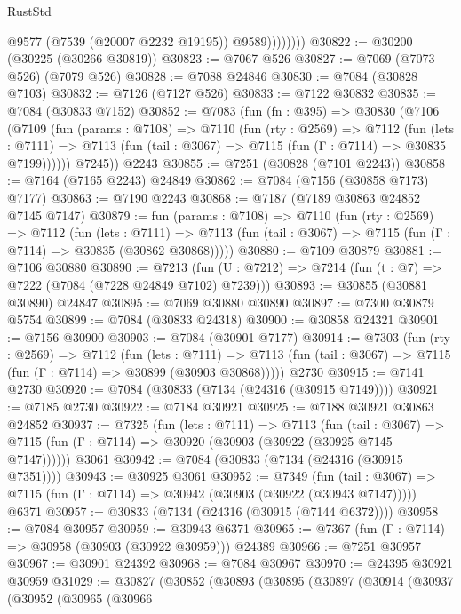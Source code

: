 \begin{lexlean}{RustStd}
\begin{coremodule}
                    @9577
                    (@7539 (@20007 @2232 @19195))
                    @9589))))))))
@30822 := @30200 (@30225 (@30266 @30819))
@30823 := @7067 @526
@30827 := @7069 (@7073 @526) (@7079 @526)
@30828 := @7088 @24846
@30830 := @7084 (@30828 @7103)
@30832 := @7126 (@7127 @526)
@30833 := @7122 @30832
@30835 := @7084 (@30833 @7152)
@30852 := @7083
    (fun (fn : @395) =>
    @30830
      (@7106
        (@7109
          (fun (params : @7108) =>
          @7110
            (fun (rty : @2569) =>
            @7112
              (fun (lets : @7111) =>
              @7113 (fun (tail : @3067) => @7115 (fun (Γ : @7114) => @30835 @7199))))))
        @7245))
    @2243
@30855 := @7251 (@30828 (@7101 @2243))
@30858 := @7164 (@7165 @2243) @24849
@30862 := @7084 (@7156 (@30858 @7173) @7177)
@30863 := @7190 @2243
@30868 := @7187 (@7189 @30863 @24852 @7145 @7147)
@30879 := fun (params : @7108) =>
  @7110
    (fun (rty : @2569) =>
    @7112
      (fun (lets : @7111) =>
      @7113 (fun (tail : @3067) => @7115 (fun (Γ : @7114) => @30835 (@30862 @30868)))))
@30880 := @7109 @30879
@30881 := @7106 @30880
@30890 := @7213
    (fun (U : @7212) => @7214 (fun (t : @7) => @7222 (@7084 (@7228 @24849 @7102) @7239)))
@30893 := @30855 (@30881 @30890) @24847
@30895 := @7069 @30880 @30890
@30897 := @7300 @30879 @5754
@30899 := @7084 (@30833 @24318)
@30900 := @30858 @24321
@30901 := @7156 @30900
@30903 := @7084 (@30901 @7177)
@30914 := @7303
    (fun (rty : @2569) =>
    @7112
      (fun (lets : @7111) =>
      @7113 (fun (tail : @3067) => @7115 (fun (Γ : @7114) => @30899 (@30903 @30868)))))
    @2730
@30915 := @7141 @2730
@30920 := @7084 (@30833 (@7134 (@24316 (@30915 @7149))))
@30921 := @7185 @2730
@30922 := @7184 @30921
@30925 := @7188 @30921 @30863 @24852
@30937 := @7325
    (fun (lets : @7111) =>
    @7113
      (fun (tail : @3067) =>
      @7115 (fun (Γ : @7114) => @30920 (@30903 (@30922 (@30925 @7145 @7147))))))
    @3061
@30942 := @7084 (@30833 (@7134 (@24316 (@30915 @7351))))
@30943 := @30925 @3061
@30952 := @7349
    (fun (tail : @3067) => @7115 (fun (Γ : @7114) => @30942 (@30903 (@30922 (@30943 @7147)))))
    @6371
@30957 := @30833 (@7134 (@24316 (@30915 (@7144 @6372))))
@30958 := @7084 @30957
@30959 := @30943 @6371
@30965 := @7367 (fun (Γ : @7114) => @30958 (@30903 (@30922 @30959))) @24389
@30966 := @7251 @30957
@30967 := @30901 @24392
@30968 := @7084 @30967
@30970 := @24395 @30921 @30959
@31029 := @30827
    (@30852
      (@30893
        (@30895
          (@30897
            (@30914
              (@30937
                (@30952
                  (@30965
                    (@30966

\end{coremodule}
\end{lexlean}
